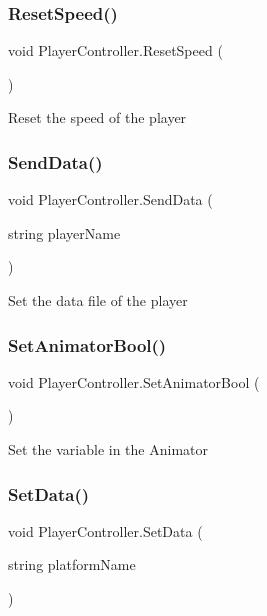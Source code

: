 \subsubsection{\texorpdfstring{Reset\+Speed()}{ResetSpeed()}}
{\footnotesize\ttfamily void Player\+Controller.\+Reset\+Speed (\begin{DoxyParamCaption}{ }\end{DoxyParamCaption})}

Reset the speed of the player \mbox{\label{class_player_controller_a4d4f54d88d40a29e71dd15a7f71d7348}} 
\subsubsection{\texorpdfstring{Send\+Data()}{SendData()}}
{\footnotesize\ttfamily void Player\+Controller.\+Send\+Data (\begin{DoxyParamCaption}\item[{string}]{player\+Name }\end{DoxyParamCaption})}

Set the data file of the player \mbox{\label{class_player_controller_a13b5778ede2ef8add0e23a3ef3b2e2fc}} 
\subsubsection{\texorpdfstring{Set\+Animator\+Bool()}{SetAnimatorBool()}}
{\footnotesize\ttfamily void Player\+Controller.\+Set\+Animator\+Bool (\begin{DoxyParamCaption}{ }\end{DoxyParamCaption})\hspace{0.3cm}{\ttfamily [private]}}

Set the variable in the Animator \mbox{\label{class_player_controller_ab1e5300124eb1aa3216cefa0e0ed4460}} 
\subsubsection{\texorpdfstring{Set\+Data()}{SetData()}}
{\footnotesize\ttfamily void Player\+Controller.\+Set\+Data (\begin{DoxyParamCaption}\item[{string}]{platform\+Name }\end{DoxyParamCaption})}


